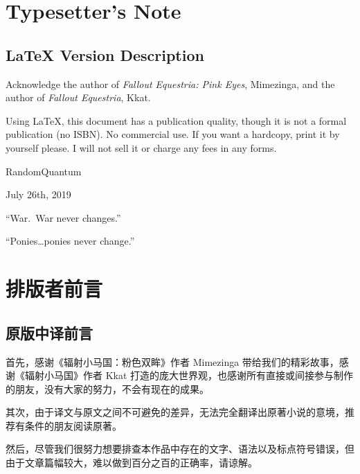 
\chapter{Typesetter's Note}

\pagestyle{english}


\section*{\LaTeX{} Version Description}

{\englinespread

Acknowledge the author of \emph{Fallout Equestria: Pink Eyes}, Mimezinga, and the author of \emph{Fallout Equestria}, Kkat.

Using \LaTeX{}, this document has a publication quality, though it is not a formal publication (no ISBN). No commercial use. If you want a hardcopy, print it by yourself please. I will not sell it or charge any fees in any forms.

\begin{flushright}
RandomQuantum

July 26th, 2019
\end{flushright}

}

\clearpage

\begin{motto}
``War. War never changes.''

\medskip

``Ponies\dots ponies never change.''
\end{motto}




\chapter{排版者前言}

\pagestyle{chinese}

\section*{原版中译前言}

首先，感谢《辐射小马国：粉色双眸》作者 Mimezinga 带给我们的精彩故事，感谢《辐射小马国》作者 Kkat 打造的庞大世界观，也感谢所有直接或间接参与制作的朋友，没有大家的努力，不会有现在的成果。

其次，由于译文与原文之间不可避免的差异，无法完全翻译出原著小说的意境，推荐有条件的朋友阅读原著。

然后，尽管我们很努力想要排查本作品中存在的文字、语法以及标点符号错误，但由于文章篇幅较大，难以做到百分之百的正确率，请谅解。

